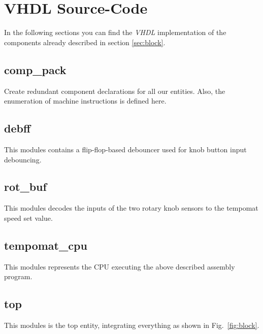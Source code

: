 \documentclass[a4paper,10pt]{scrartcl}
\begin{document}
\section{VHDL Source-Code}
\label{sec:vhdl}


In the following sections you can find the \emph{VHDL} implementation
of the components already described in section \ref{sec:block}.

\subsection{comp\_pack}
Create redundant component declarations for all our entities. 
Also, the enumeration of machine instructions is defined here. 



\subsection{debff}
This modules contains a flip-flop-based debouncer used for knob button input debouncing. 





\subsection{rot\_buf}
This modules decodes the inputs of the two rotary knob sensors to the tempomat speed set value. 





\subsection{tempomat\_cpu}
This modules represents the CPU executing the above described assembly program. 





\subsection{top}
This modules is the top entity, integrating everything as shown in Fig.\ \ref{fig:block}.
\end{document}

